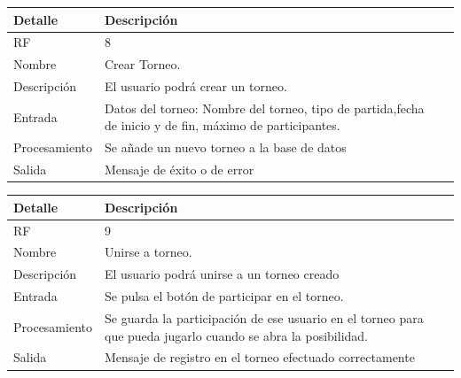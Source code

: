 \documentclass{article}
\begin{document}
\begin{table}[H]
  \begin{center}
    \begin{tabularx}{\linewidth}{|X|X|X|} %
      \hline
      \textbf{Detalle} & \textbf{Descripción}\\
      \hline
      RF & 8 \\
      \hline
      Nombre & Crear Torneo.\\
      \hline
      Descripción & El usuario podrá crear un torneo.\\
      \hline
      Entrada & Datos del torneo: Nombre del torneo, tipo de partida,fecha de inicio y de fin, máximo de participantes.\\
      \hline
      Procesamiento & Se añade un nuevo torneo a la base de datos\\
      \hline
      Salida & Mensaje de éxito o de error\\
      \hline
    \end{tabularx}
  \end{center}
\end{table}

\begin{table}[H]
  \begin{center}
    \begin{tabularx}{\linewidth}{|X|X|X|} %
      \hline
      \textbf{Detalle} & \textbf{Descripción}\\
      \hline
      RF & 9 \\
      \hline
      Nombre & Unirse a torneo.\\
      \hline
      Descripción & El usuario podrá unirse a un torneo creado\\
      \hline
      Entrada & Se pulsa el botón de participar en el torneo.\\
      \hline
      Procesamiento & Se guarda la participación de ese usuario en el torneo para que pueda jugarlo cuando se abra la posibilidad.\\
      \hline
      Salida & Mensaje de registro en el torneo efectuado correctamente\\
      \hline
    \end{tabularx}
  \end{center}
\end{table}
\end{document}

